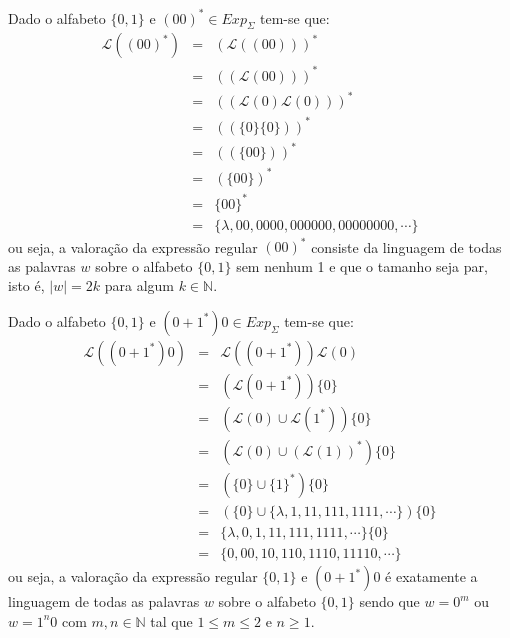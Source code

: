 \begin{example}\label{exe:ValoracaoExpressao1}
	Dado o alfabeto $\{0,1\}$ e $(00)^* \in Exp_\Sigma$ tem-se que:
	\begin{eqnarray*}
		\mathcal{L}((00)^*) & = & (\mathcal{L}((00)))^*\\
		& = & ((\mathcal{L}(00)))^*\\
		& = & ((\mathcal{L}(0)\mathcal{L}(0)))^*\\
		& = & ((\{0\}\{0\}))^*\\
		& = & ((\{00\}))^*\\
		& = & (\{00\})^*\\
		& = & \{00\}^*\\
		& = & \{\lambda, 00, 0000, 000000, 00000000, \cdots\}
	\end{eqnarray*}
	ou seja, a valoração da expressão regular $(00)^*$ consiste da linguagem de todas as palavras $w$ sobre o alfabeto $\{0,1\}$ sem nenhum 1 e que o tamanho seja par, isto é, $|w| = 2k$ para algum $k \in \mathbb{N}$.
\end{example}


\begin{example}\label{exe:ValoracaoExpressao2}
	Dado o alfabeto $\{0,1\}$ e $(0 + 1^*)0 \in Exp_\Sigma$ tem-se que:
	\begin{eqnarray*}
		\mathcal{L}((0 + 1^*)0 ) & = & \mathcal{L}((0 + 1^*))\mathcal{L}(0)\\
		& = & (\mathcal{L}(0 + 1^*))\{0\}\\
		& = & (\mathcal{L}(0) \cup  \mathcal{L}(1^*))\{0\}\\
		& = & (\mathcal{L}(0) \cup  (\mathcal{L}(1))^*)\{0\}\\
		& = & (\{0\} \cup \{1\}^*)\{0\}\\
		& = & (\{0\} \cup \{\lambda, 1, 11, 111, 1111, \cdots\})\{0\}\\
		& = & \{\lambda, 0, 1, 11, 111, 1111, \cdots\}\{0\}\\
		& = & \{0, 00, 10, 110, 1110, 11110, \cdots \}
	\end{eqnarray*}
	ou seja, a valoração da expressão regular $\{0,1\}$ e $(0 + 1^*)0$ é exatamente a linguagem de todas as palavras $w$ sobre o alfabeto $\{0,1\}$  sendo que $w = 0^m$ ou $w = 1^n0$ com $m,n \in \mathbb{N}$ tal que $1 \leq m \leq 2$ e $n \geq 1$.
\end{example}

